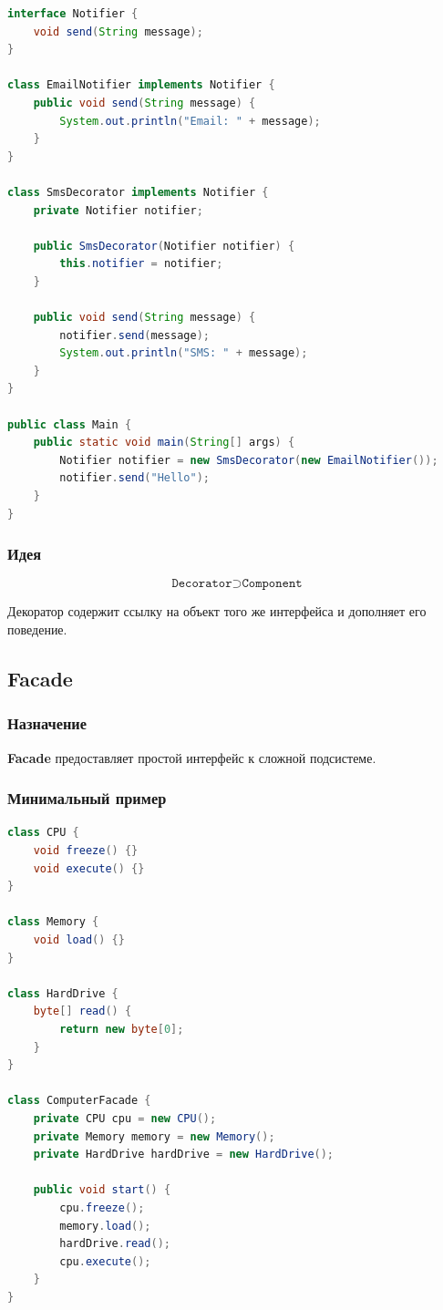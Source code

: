 \documentclass[12pt,a4paper]{article}
\begin{document}
\begin{lstlisting}[language=Java,caption={Decorator}]
interface Notifier {
    void send(String message);
}

class EmailNotifier implements Notifier {
    public void send(String message) {
        System.out.println("Email: " + message);
    }
}

class SmsDecorator implements Notifier {
    private Notifier notifier;

    public SmsDecorator(Notifier notifier) {
        this.notifier = notifier;
    }

    public void send(String message) {
        notifier.send(message);
        System.out.println("SMS: " + message);
    }
}

public class Main {
    public static void main(String[] args) {
        Notifier notifier = new SmsDecorator(new EmailNotifier());
        notifier.send("Hello");
    }
}
\end{lstlisting}

\subsubsection{Идея}

\[
\texttt{Decorator} \supset \texttt{Component}
\]

Декоратор содержит ссылку на объект того же интерфейса и дополняет его поведение.

\subsection{Facade}

\subsubsection{Назначение}

\textbf{Facade} предоставляет простой интерфейс к сложной подсистеме.

\subsubsection{Минимальный пример}

\begin{lstlisting}[language=Java,caption={Facade}]
class CPU {
    void freeze() {}
    void execute() {}
}

class Memory {
    void load() {}
}

class HardDrive {
    byte[] read() {
        return new byte[0];
    }
}

class ComputerFacade {
    private CPU cpu = new CPU();
    private Memory memory = new Memory();
    private HardDrive hardDrive = new HardDrive();

    public void start() {
        cpu.freeze();
        memory.load();
        hardDrive.read();
        cpu.execute();
    }
}
\end{lstlisting}
\end{document}

